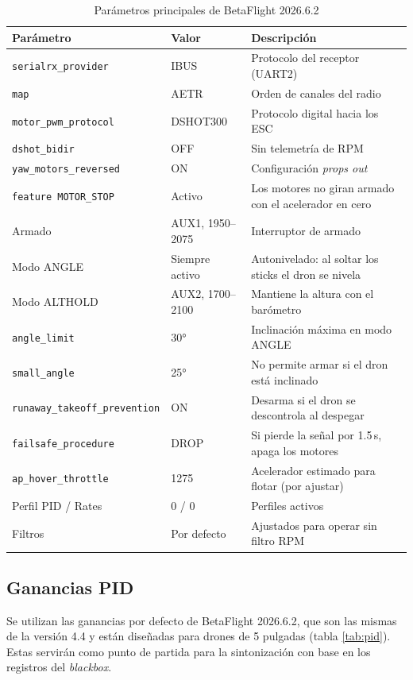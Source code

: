 \documentclass[11pt,letterpaper]{article}
\begin{document}
\begin{table}[!ht]
\centering
\caption{Parámetros principales de BetaFlight 2026.6.2}
\label{tab:config}
\begin{tabularx}{\textwidth}{@{}llX@{}}
\toprule
\textbf{Parámetro} & \textbf{Valor} & \textbf{Descripción} \\
\midrule
\texttt{serialrx\_provider} & IBUS & Protocolo del receptor (UART2) \\
\texttt{map} & AETR & Orden de canales del radio \\
\texttt{motor\_pwm\_protocol} & DSHOT300 & Protocolo digital hacia los ESC \\
\texttt{dshot\_bidir} & OFF & Sin telemetría de RPM \\
\texttt{yaw\_motors\_reversed} & ON & Configuración \textit{props out} \\
\texttt{feature MOTOR\_STOP} & Activo & Los motores no giran armado con el acelerador en cero \\
Armado & AUX1, 1950--2075 & Interruptor de armado \\
Modo ANGLE & Siempre activo & Autonivelado: al soltar los sticks el dron se nivela \\
Modo ALTHOLD & AUX2, 1700--2100 & Mantiene la altura con el barómetro \\
\texttt{angle\_limit} & 30° & Inclinación máxima en modo ANGLE \\
\texttt{small\_angle} & 25° & No permite armar si el dron está inclinado \\
\texttt{runaway\_takeoff\_prevention} & ON & Desarma si el dron se descontrola al despegar \\
\texttt{failsafe\_procedure} & DROP & Si pierde la señal por 1.5\,s, apaga los motores \\
\texttt{ap\_hover\_throttle} & 1275 & Acelerador estimado para flotar (por ajustar) \\
Perfil PID / Rates & 0 / 0 & Perfiles activos \\
Filtros & Por defecto & Ajustados para operar sin filtro RPM \\
\bottomrule
\end{tabularx}
\end{table}

\newpage
\subsection{Ganancias PID}
Se utilizan las ganancias por defecto de BetaFlight 2026.6.2, que son las mismas de la versión 4.4 y están diseñadas para drones de 5 pulgadas (tabla \ref{tab:pid}). Estas servirán como punto de partida para la sintonización con base en los registros del \textit{blackbox}.
\end{document}
